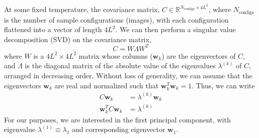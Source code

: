 \documentclass[../main.tex]{subfiles}
\begin{document}
At some fixed temperature, the covariance matrix, $C \in
\mathbb{R}^{N_{\mathrm{configs}}\times4L^2}$, where $N_{\mathrm{configs}}$ is
the number of sample configurations (images), with each configuration flattened
into a vector of length $4L^2$.
%
We can then perform a singular value decomposition (SVD) on the covariance
matrix,
%
\begin{equation}
    C = W\Lambda W^{T}
    \label{svd}
\end{equation}
%
where $W$ is a $4L^2\times 4L^2$ matrix whose columns ($\mathbf{w}_k$) are the
eigenvectors of $C$, and $\Lambda$ is the diagonal matrix of the absolute value
of the eigenvalues $\lambda^{(k)}$ of $C$, arranged in decreasing order.
%
Without loss of generality, we can assume that the eigenvectors $\mathbf{w}_k$
are real and normalized such that $\mathbf{w}_k^{T} \mathbf{w}_k = 1$.
%
Thus, we can write
%
\begin{align}
    C \mathbf{w}_k &= \lambda^{(k)} \mathbf{w}_k\\
    \mathbf{w}_k^{T} C \mathbf{w}_k &= \lambda^{(k)}
\end{align}
%
For our purposes, we are interested in the first principal component, with
eigenvalue $\lambda^{(1)} \equiv \lambda_1$ and corresponding eigenvector
$\mathbf{w}_1$.
\end{document}
